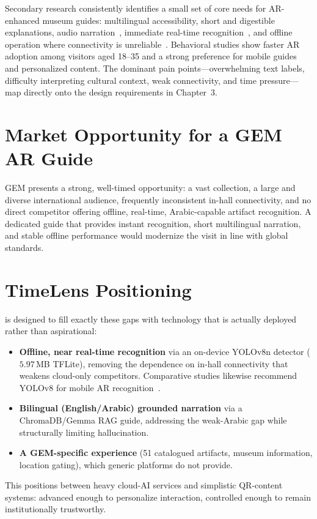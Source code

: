 Secondary research consistently identifies a small set of core needs for AR-enhanced
museum guides: multilingual accessibility, short and digestible
explanations, audio narration~\citep{Ibanez2018}, immediate
real-time recognition~\citep{Radu2014}, and offline operation where connectivity is
unreliable~\citep{Bekele2018}. Behavioral studies show faster AR adoption among
visitors aged 18--35 and a strong preference for mobile guides and personalized
content. The dominant pain points---overwhelming text
labels, difficulty interpreting cultural context, weak connectivity, and time
pressure---map directly onto the design requirements in Chapter~3.

\section{Market Opportunity for a GEM AR Guide}

GEM presents a strong, well-timed opportunity: a vast collection, a large and diverse
international audience, frequently inconsistent in-hall connectivity, and no direct
competitor offering offline, real-time, Arabic-capable artifact recognition. A
dedicated guide that provides instant recognition, short multilingual narration, and
stable offline performance would modernize the visit in line with global standards.

\section{TimeLens Positioning}

\TimeLens{} is designed to fill exactly these gaps with technology that is actually
deployed rather than aspirational:
\begin{itemize}[leftmargin=1.5em]
  \item \textbf{Offline, near real-time recognition} via an on-device YOLOv8n detector
        ($5.97$\,MB TFLite), removing the dependence on in-hall connectivity that
        weakens cloud-only competitors. Comparative studies likewise recommend YOLOv8
        for mobile AR recognition~\citep{ipalakova2025comparative}.
  \item \textbf{Bilingual (English/Arabic) grounded narration} via a ChromaDB/Gemma RAG
        guide, addressing the weak-Arabic gap while structurally limiting hallucination.
  \item \textbf{A GEM-specific experience} (51 catalogued artifacts, museum information,
        location gating), which generic platforms do not provide.
\end{itemize}
This positions \TimeLens{} between heavy cloud-AI services and simplistic QR-content
systems: advanced enough to personalize interaction, controlled enough to remain
institutionally trustworthy.

